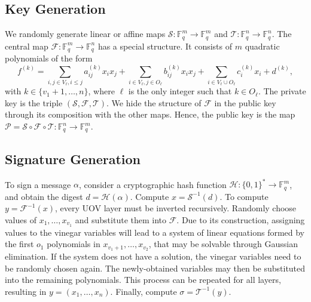 \documentclass[11pt]{article}
\begin{document}
\subsection{Key Generation}

We randomly generate linear or affine maps
$\mathcal{S}: \mathbb{F}_{q}^{m} \rightarrow \mathbb{F}_{q}^{m}$ and
$\mathcal{T}: \mathbb{F}_{q}^{n} \rightarrow \mathbb{F}_{q}^{n}$. The central
map $\mathcal{F}: \mathbb{F}_{q}^{m} \rightarrow \mathbb{F}_{q}^{n}$
has a special structure. It consists of $m$ quadratic polynomials of the form
\begin{equation}\label{eq:0}
  f^{(k)} = \sum_{i, j \in V_{\ell}, i \leq j} a_{ij}^{(k)} x_{i} x_{j}
              + \sum_{i \in V_{\ell}, j \in O_{\ell}} b_{ij}^{(k)} x_{i} x_{j}
              + \sum_{i \in V_{\ell} \cup O_{\ell}} c_{i}^{(k)} x_{i} + d^{(k)},
\end{equation}
with $k \in \{v_{1} + 1, \dots, n\}$, where $\ell$ is the only integer such
that $k \in O_{\ell}$. The private key is the triple
$(\mathcal{S}, \mathcal{F}, \mathcal{T})$. We hide the structure of
$\mathcal{F}$ in the public key through its composition with the other maps.
Hence, the public key is the map $\mathcal{P} = \mathcal{S} \circ \mathcal{F}
\circ \mathcal{T} : \mathbb{F}_{q}^{n} \rightarrow \mathbb{F}_{q}^{m}$.

\subsection{Signature Generation}

To sign a message $\alpha$, consider a cryptographic hash function
$\mathcal{H} : {\{0, 1\}}^{*} \rightarrow \mathbb{F}_{q}^{m}$, and obtain the
digest $d = \mathcal{H}(\alpha)$. Compute $x = \mathcal{S}^{-1}(d)$. To compute
$y = \mathcal{F}^{-1}(x)$, every UOV layer must be inverted recursively.
Randomly choose values of $x_{1}, \dots, x_{v_{1}}$ and substitute them into
$\mathcal{F}$. Due to its construction, assigning values to the vinegar
variables will lead to a system of linear equations formed by the first $o_{1}$
polynomials in $x_{v_{1} + 1}, \dots, x_{v_{2}}$, that may be solvable through
Gaussian elimination. If the system does not have a solution, the vinegar
variables need to be randomly chosen again. The newly-obtained variables may
then be substituted into the remaining polynomials. This process can be
repeated for all layers, resulting in $y = (x_{1}, \dots, x_{n})$. Finally,
compute $\sigma = \mathcal{T}^{-1}(y)$.
\end{document}
